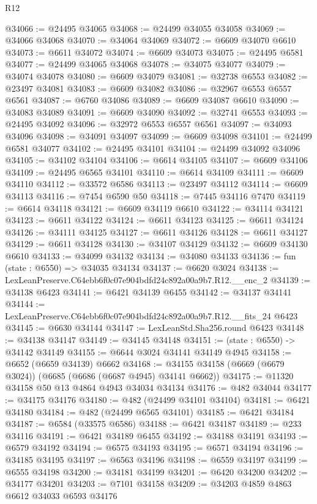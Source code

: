 \begin{lexlean}{R12}
\begin{coremodule}
@34066 := @24495 @34065
@34068 := @24499 @34055 @34058
@34069 := @34066 @34068
@34070 := @34064 @34069
@34072 := @6609 @34070 @6610
@34073 := @6611 @34072
@34074 := @6609 @34073
@34075 := @24495 @6581
@34077 := @24499 @34065 @34068
@34078 := @34075 @34077
@34079 := @34074 @34078
@34080 := @6609 @34079
@34081 := @32738 @6553
@34082 := @23497 @34081
@34083 := @6609 @34082
@34086 := @32967 @6553 @6557 @6561
@34087 := @6760 @34086
@34089 := @6609 @34087 @6610
@34090 := @34083 @34089
@34091 := @6609 @34090
@34092 := @32741 @6553
@34093 := @24495 @34092
@34096 := @32972 @6553 @6557 @6561
@34097 := @34093 @34096
@34098 := @34091 @34097
@34099 := @6609 @34098
@34101 := @24499 @6581 @34077
@34102 := @24495 @34101
@34104 := @24499 @34092 @34096
@34105 := @34102 @34104
@34106 := @6614 @34105
@34107 := @6609 @34106
@34109 := @24495 @6565 @34101
@34110 := @6614 @34109
@34111 := @6609 @34110
@34112 := @33572 @6586
@34113 := @23497 @34112
@34114 := @6609 @34113
@34116 := @7454 @6590 @50
@34118 := @7445 @34116 @7470
@34119 := @6614 @34118
@34121 := @6609 @34119 @6610
@34122 := @34114 @34121
@34123 := @6611 @34122
@34124 := @6611 @34123
@34125 := @6611 @34124
@34126 := @34111 @34125
@34127 := @6611 @34126
@34128 := @6611 @34127
@34129 := @6611 @34128
@34130 := @34107 @34129
@34132 := @6609 @34130 @6610
@34133 := @34099 @34132
@34134 := @34080 @34133
@34136 := fun (state : @6550) => @34035 @34134
@34137 := @6620 @3024
@34138 := LexLeanPreserve.C64ebb6f0c07e904bdfd24c892a00a9b7.R12.__enc_2
@34139 := @34138 @6423
@34141 := @6421 @34139 @6455
@34142 := @34137 @34141
@34144 := LexLeanPreserve.C64ebb6f0c07e904bdfd24c892a00a9b7.R12.__fits_24 @6423
@34145 := @6630 @34144
@34147 := LexLeanStd.Sha256.round @6423
@34148 := @34138 @34147
@34149 := @34145 @34148
@34151 := (state : @6550) -> @34142 @34149
@34155 := @6644 @3024 @34141 @34149 @4945
@34158 := @6652 (@6659 @34139) @6662
@34168 := @34155 @34158 (@6669 (@6679 @3024)) (@6685 (@6686 (@6687 @4945) @34141 @6662))
@34175 := @11320 @34158 @50 @13 @4864 @4943 @34034 @34134
@34176 := @482 @34044
@34177 := @34175 @34176
@34180 := @482 (@24499 @34101 @34104)
@34181 := @6421 @34180
@34184 := @482 (@24499 @6565 @34101)
@34185 := @6421 @34184
@34187 := @6584 (@33575 @6586)
@34188 := @6421 @34187
@34189 := @233 @34116
@34191 := @6421 @34189 @6455
@34192 := @34188 @34191
@34193 := @6579 @34192
@34194 := @6575 @34193
@34195 := @6571 @34194
@34196 := @34185 @34195
@34197 := @6563 @34196
@34198 := @6559 @34197
@34199 := @6555 @34198
@34200 := @34181 @34199
@34201 := @6420 @34200
@34202 := @34177 @34201
@34203 := @7101 @34158
@34209 := @34203 @4859 @4863 @6612 @34033 @6593 @34176

\end{coremodule}
\end{lexlean}
